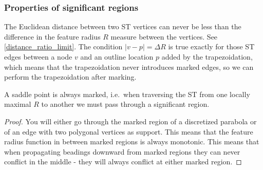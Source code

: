 \iffalse

\subsubsection{Properties of significant regions}
The Euclidean distance between two ST vertices can never be less than the difference in the feature radius $R$ measure between the vertices.
See \cref{distance_ratio_limit}.
The condition $|v - p| = \Delta R$ is true exactly for those ST edges between a node $v$ and an outline location $p$ added by the trapezoidation, which means that the trapezoidation never introduces marked edges, so we can perform the trapezoidation after marking.

\begin{lemma}\label{saddle_points_are_marked}
A saddle point is always marked, i.e.\
when traversing the ST from one locally maximal $R$ to another we must pass through a significant region.
\end{lemma}
\begin{proof}
You will either go through the marked region of a discretized parabola or of an edge with two polygonal vertices as support.
This means that the feature radius function in between marked regions is always monotonic.
This means that when propagating beadings downward from marked regions they can never conflict in the middle - they will always conflict at either marked region.
\end{proof}

